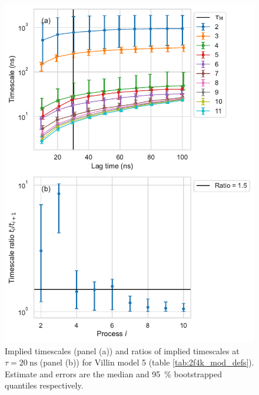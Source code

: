 \documentclass{article}
\begin{document}
\begin{figure}
    \centering
    \includegraphics[height=0.65\textheight]{figures/its/villin/Villin_model_dihed._method_m2.pdf}
    \caption{Implied timescales (panel (a)) and ratios of implied timescales at $\tau=\SI{20}{\nano\second}$ (panel (b)) for Villin model 5 (table \ref{tab:2f4k_mod_defs}). Estimate and errors are the median and \SI{95}{\percent} bootstrapped quantiles respectively.}
    \label{fig:its_villin_5}
\end{figure}
\end{document}

